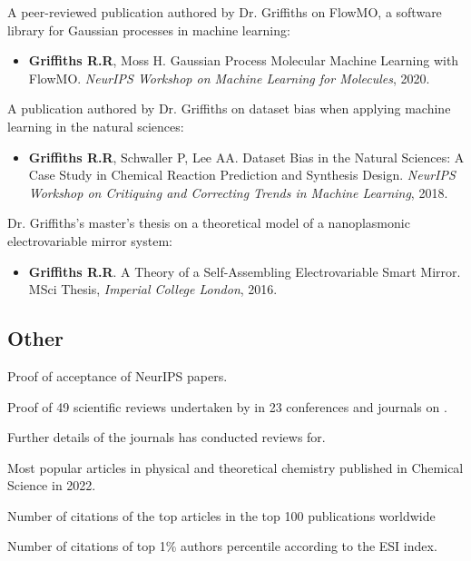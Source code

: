 \documentclass[11pt]{article}
\begin{document}
\begin{thebibliography}{9}
A peer-reviewed publication authored by Dr. Griffiths on FlowMO, a software library for Gaussian processes in machine learning:
\begin{itemize}
\item \textbf{Griffiths R.R}, Moss H. Gaussian Process Molecular Machine Learning with FlowMO. \textit{NeurIPS Workshop on Machine Learning for Molecules}, 2020.
\end{itemize}

A publication authored by Dr. Griffiths on dataset bias when applying machine learning in the natural sciences:
\begin{itemize}
\item \textbf{Griffiths R.R}, Schwaller P, Lee AA. Dataset Bias in the Natural Sciences: A Case Study in Chemical Reaction Prediction and Synthesis Design. \textit{NeurIPS Workshop on Critiquing and Correcting Trends in Machine Learning}, 2018.
\end{itemize}

Dr. Griffiths's master's thesis on a theoretical model of a nanoplasmonic electrovariable mirror system:
\begin{itemize}
\item \textbf{Griffiths R.R}. A Theory of a Self-Assembling Electrovariable Smart Mirror. MSci Thesis, \textit{Imperial College London}, 2016.
\end{itemize}

\subsection*{Other}


Proof of acceptance of  NeurIPS papers.

Proof of 49 scientific reviews undertaken by \dr in 23 conferences and journals on \fie{}.

Further details of the journals \dr has conducted reviews for.

Most popular articles in physical and theoretical chemistry published in Chemical Science in 2022.

Number of citations of the top articles in the top 100 publications worldwide
 
Number of citations of top 1\% authors percentile according to the ESI index.


\end{thebibliography}
\end{document}
